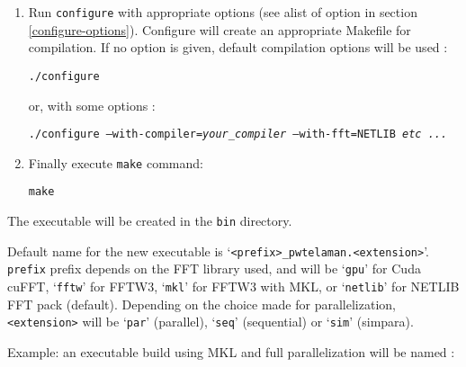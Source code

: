 \documentclass[12pt]{article}
\begin{document}
\begin{enumerate}
\hspace*{1cm}
{\tt .~/etc/profile.d/modules.sh} 

and for csh: 

\hspace*{1cm}
{\tt .~/etc/profile.d/modules.csh}. 

Once you have done this, you can run: 

\hspace*{1cm}
{\tt module load <module name>}


For example:

\hspace*{1cm}
{\tt module load intel/composer\_xe\_2013.4.183}

\hspace*{1cm}
{\tt module load cuda/5.0}

\hspace*{1cm}
{\tt module load openmpi/1.6.4-intel}

\newpage
\item Run {\tt configure} with appropriate options (see alist of option in section \ref{configure-options}).
Configure will create an appropriate Makefile for compilation. 
If no option is given, default compilation options will be used :

\hspace*{1cm}
{\tt ./configure }

or, with some options :

\hspace*{1cm}
{\tt ./configure --with-compiler={\it your\_compiler} --with-fft=NETLIB {\it etc ...}}

\item Finally execute {\tt make} command:

\hspace*{1cm}
{\tt make}

\end{enumerate}

The executable will be created in the {\tt bin} directory.
 
Default name for the new executable is `{\tt <prefix>\_pwtelaman.<extension>}'.
{\tt prefix} prefix depends on the FFT library used, and will be `{\tt gpu}' for Cuda cuFFT, `{\tt fftw}' for FFTW3, `{\tt mkl}' for FFTW3 with MKL, or `{\tt netlib}' for NETLIB FFT pack (default).
Depending on the choice made for parallelization, {\tt <extension>} will be `{\tt par}' (parallel), `{\tt seq}' (sequential) or `{\tt sim}' (simpara).

Example: an executable build using MKL and full parallelization will be named :
\end{document}
